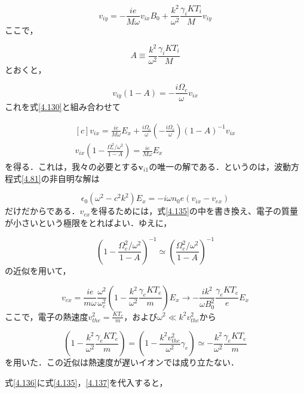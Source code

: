 \documentclass{ltjsarticle}
\numberwithin{equation}{section} %
\begin{document}
\begin{equation}
  v_{iy} = -\frac{ie}{M\omega}v_{ix}B_0 + \frac{k^2}{\omega^2}\frac{\gamma_iKT_i}{M}v_{iy} \label{4.133}
\end{equation}
ここで，

\[
  A \equiv \frac{k^2}{\omega^2}\frac{\gamma_iKT_i}{M}
\]
とおくと，

\begin{equation}
  v_{iy}(1-A) = -\frac{i\Omega_c}{\omega}v_{ix} \label{4.134}
\end{equation}
これを式\eqref{4.130}と組み合わせて

\begin{equation}
  \begin{gathered}[c]
    v_{ix} = \frac{ie}{M\omega}E_x + \frac{i\Omega_c}{\omega}\left(-\frac{i\Omega_c}{\omega}\right)(1-A)^{-1}v_{ix}\\
    v_{ix}\left(1 - \frac{\Omega^2_c/\omega^2}{1-A}\right) = \frac{ie}{M\omega}E_x
  \end{gathered} \label{4.135}
\end{equation}
を得る．これは，我々の必要とする$\bm{v}_{i1}$の唯一の解である．というのは，波動方程式\eqref{4.81}の非自明な解は

\begin{equation}
  \epsilon_0(\omega^2 - c^2k^2)E_x = -i\omega n_0e(v_{ix}-v_{ex}) \label{4.136}
\end{equation}
だけだからである．$v_{ex}$を得るためには，式\eqref{4.135}の中を書き換え、電子の質量が小さいという極限をとればよい．ゆえに，

\[
  \left(1 - \frac{\Omega^2_c/\omega^2}{1-A}\right)^{-1} \simeq \left(\frac{\Omega^2_c/\omega^2}{1-A}\right)^{-1}
\]
の近似を用いて，

\begin{equation}
  v_{ex} = \frac{ie}{m\omega}\frac{\omega^2}{\omega^2_c}\left(1 - \frac{k^2}{\omega^2}\frac{\gamma_eKT_e}{m}\right)E_x \rightarrow -\frac{ik^2}{\omega B^2_0}\frac{\gamma_e KT_e}{e}E_x \label{4.137}
\end{equation}
ここで，電子の熱速度$v^2_{the} = \frac{KT_e}{m}$，および$\omega^2\ll k^2v^2_{the}$から

\[
 \left(1 - \frac{k^2}{\omega^2}\frac{\gamma_eKT_e}{m}\right) = \left(1 - \frac{k^2v^2_{the}}{\omega^2}\gamma_e\right) \simeq - \frac{k^2}{\omega^2}\frac{\gamma_eKT_e}{m}
\]
を用いた．この近似は熱速度が遅いイオンでは成り立たない．

式\eqref{4.136}に式\eqref{4.135}，\eqref{4.137}を代入すると，
\end{document}
